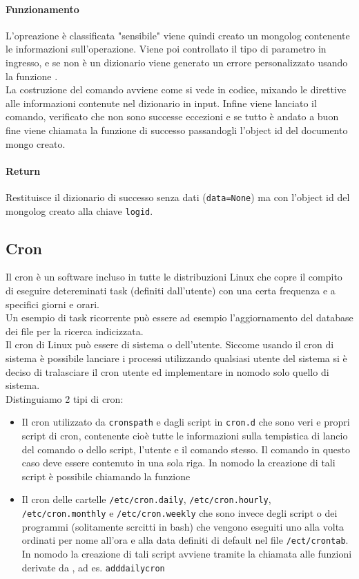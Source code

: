 \documentclass[11pt]{article}
\begin{document}
\paragraph{Funzionamento}
L'opreazione è classificata "sensibile" viene quindi creato un mongolog contenente le informazioni sull'operazione.
Viene poi controllato il tipo di parametro in ingresso, e se non è un dizionario viene generato un errore personalizzato
usando la funzione .\\
La costruzione del comando avviene come si vede in codice, mixando le direttive alle informazioni contenute
nel dizionario in input. Infine viene lanciato il comando, verificato che non sono successe eccezioni e se tutto
è andato a buon fine viene chiamata la funzione di successo passandogli l'object id del documento mongo creato.
\paragraph{Return}
Restituisce il dizionario di successo senza dati (\texttt{data=None}) ma con l'object id del mongolog creato
alla chiave \texttt{logid}.

\subsection{Cron}
Il cron è un software incluso in tutte le distribuzioni Linux che copre il compito di eseguire
detereminati task (definiti dall'utente) con una certa frequenza e a specifici giorni e orari.\\
Un esempio di task ricorrente può essere ad esempio l'aggiornamento del database dei file per
la ricerca indicizzata.\\
Il cron di Linux può essere di sistema o dell'utente. Siccome usando il cron di sistema è possibile lanciare i processi
utilizzando qualsiasi utente del sistema si è deciso di tralasciare il cron utente ed implementare in nomodo
solo quello di sistema.\\
Distinguiamo 2 tipi di cron:
\begin{itemize}
	\item{Il cron utilizzato da \texttt{cronspath} e dagli script in \texttt{cron.d} che sono veri e propri
		script di cron, contenente cioè tutte le informazioni sulla tempistica di lancio del comando o
		dello script, l'utente e il comando stesso. Il comando in questo caso deve essere contenuto in una sola riga.
		In nomodo la creazione di tali script è possibile chiamando la funzione }
	\item{Il cron delle cartelle \texttt{/etc/cron.daily}, \texttt{/etc/cron.hourly}, \texttt{/etc/cron.monthly} e \texttt{/etc/cron.weekly}
		che sono invece degli script o dei programmi (solitamente scrcitti in bash) che vengono eseguiti uno
		alla volta ordinati per nome all'ora e alla data definiti di default nel file \texttt{/ect/crontab}.
		In nomodo la creazione di tali script avviene tramite la chiamata alle funzioni derivate da ,
		ad es. \texttt{adddailycron}}
\end{itemize}
\end{document}
